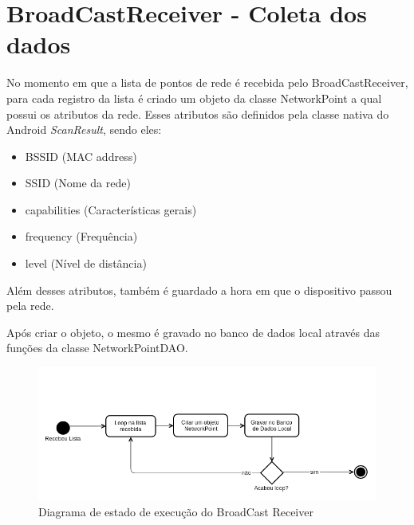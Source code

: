 \documentclass[12pt, %
openright, 
oneside, %
a4paper,    %
brazil]{facom-ufu-abntex2}
\begin{document}
\section{BroadCastReceiver - Coleta dos dados}
No momento em que a lista de pontos de rede é recebida pelo BroadCastReceiver, para cada registro da lista é criado um objeto da classe NetworkPoint a qual possui os atributos da rede. Esses atributos são definidos pela classe nativa do Android \emph{ScanResult}, sendo eles:

\begin{itemize}
\item BSSID (MAC address)
\item SSID (Nome da rede)
\item capabilities (Características gerais)
\item frequency (Frequência)
\item level (Nível de distância)
\end{itemize}
Além desses atributos, também é guardado a hora em que o dispositivo passou pela rede.

Após criar o objeto, o mesmo é gravado no banco de dados local através das funções da classe NetworkPointDAO.
\begin{figure}[!htb]
    \centering
    \includegraphics[scale=0.45,natwidth=610,natheight=64]{pherocast2.png}
    \caption{Diagrama de estado de execução do BroadCast Receiver}
    \label{figRotulo}
  \end{figure}
  
\end{document}
